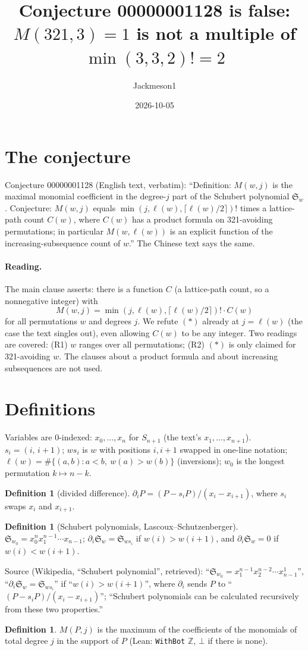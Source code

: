 \documentclass[11pt]{article}
\title{Conjecture 00000001128 is false:\\ $M(321,3)=1$ is not a multiple of $\min(3,3,2)!=2$}
\author{Jackmeson1}
\date{2026-10-05}
\theoremstyle{definition}
\newtheorem{definition}[theorem]{Definition}
\newcommand{\Sch}{\mathfrak S}
\begin{document}
\maketitle

\section{The conjecture}
Conjecture 00000001128 (English text, verbatim): ``Definition: $M(w,j)$ is the maximal monomial
coefficient in the degree-$j$ part of the Schubert polynomial $\Sch_w$. Conjecture: $M(w,j)$
equals $\min(j, \ell(w), \lceil \ell(w)/2\rceil)!$ times a lattice-path count $C(w)$, where $C(w)$
has a product formula on 321-avoiding permutations; in particular $M(w, \ell(w))$ is an explicit
function of the increasing-subsequence count of $w$.'' The Chinese text says the same.

\paragraph{Reading.} The main clause asserts: there is a function $C$ (a lattice-path count, so a
nonnegative integer) with
\[ M(w,j)=\min(j,\ell(w),\lceil\ell(w)/2\rceil)!\cdot C(w) \tag{$\ast$} \]
for all permutations $w$ and degrees $j$. We refute $(\ast)$ already at $j=\ell(w)$ (the case
the text singles out), even allowing $C(w)$ to be any integer. Two readings are covered:
(R1) $w$ ranges over all permutations; (R2) $(\ast)$ is only claimed for 321-avoiding $w$.
The clauses about a product formula and about increasing subsequences are not used.

\section{Definitions}
Variables are 0-indexed: $x_0,\dots,x_n$ for $S_{n+1}$ (the text's $x_1,\dots,x_{n+1}$).
$s_i=(i,\,i+1)$; $w s_i$ is $w$ with positions $i,i+1$ swapped in one-line notation;
$\ell(w)=\#\{(a,b): a<b,\ w(a)>w(b)\}$ (inversions); $w_0$ is the longest permutation
$k\mapsto n-k$.
\begin{definition}[divided difference]
$\partial_i P=(P-s_iP)/(x_i-x_{i+1})$, where $s_i$ swaps $x_i$ and $x_{i+1}$.
\end{definition}
\begin{definition}[Schubert polynomials, Lascoux--Schutzenberger]
$\Sch_{w_0}=x_0^{n}x_1^{n-1}\cdots x_{n-1}$; $\partial_i\Sch_w=\Sch_{ws_i}$ if $w(i)>w(i+1)$, and
$\partial_i\Sch_w=0$ if $w(i)<w(i+1)$.
\end{definition}
Source (Wikipedia, ``Schubert polynomial'', retrieved): ``${\mathfrak S}_{w_{0}}=x_{1}^{n-1}
x_{2}^{n-2}\cdots x_{n-1}^{1}$'', ``$\partial_{i}{\mathfrak S}_{w}={\mathfrak S}_{ws_{i}}$'' if
``$w(i)>w(i+1)$'', where $\partial_i$ sends $P$ to ``$(P-s_{i}P)/(x_{i}-x_{i+1})$''; ``Schubert
polynomials can be calculated recursively from these two properties.''
\begin{definition}
$M(P,j)$ is the maximum of the coefficients of the monomials of total degree $j$ in the support of
$P$ (Lean: \texttt{WithBot} $\mathbb Z$, $\bot$ if there is none).
\end{definition}
\end{document}
